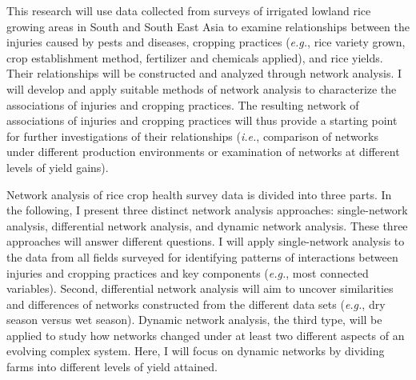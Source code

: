 


This research will use data collected from surveys of irrigated lowland rice growing areas in South and South East Asia to examine relationships between the injuries caused by pests and diseases, cropping practices (\textit{e.g.}, rice variety grown, crop establishment method, fertilizer and chemicals applied), and rice yields. Their relationships will be constructed and analyzed through network analysis. I will develop and apply suitable methods of network analysis to characterize the associations of injuries and cropping practices. The resulting network of associations of injuries and cropping practices will thus provide a starting point for further investigations of their relationships (\textit{i.e.}, comparison of networks under different production environments or examination of networks at different levels of yield gains). 

Network analysis of rice crop health survey data is divided into three parts. In the following, I present three distinct network analysis approaches: single-network analysis, differential network analysis, and dynamic network analysis. These three approaches will answer different questions. I will apply single-network analysis to the data from all fields surveyed for identifying patterns of interactions between injuries and cropping practices and key components (\textit{e.g.}, most connected variables). Second, differential network analysis will aim to uncover similarities and differences of networks constructed from the different data sets (\textit{e.g.}, dry season versus wet season). Dynamic network analysis, the third type, will be applied to study how networks changed under at least two different aspects of an evolving complex system. Here, I will focus on dynamic networks by dividing farms into different levels of yield attained. 

